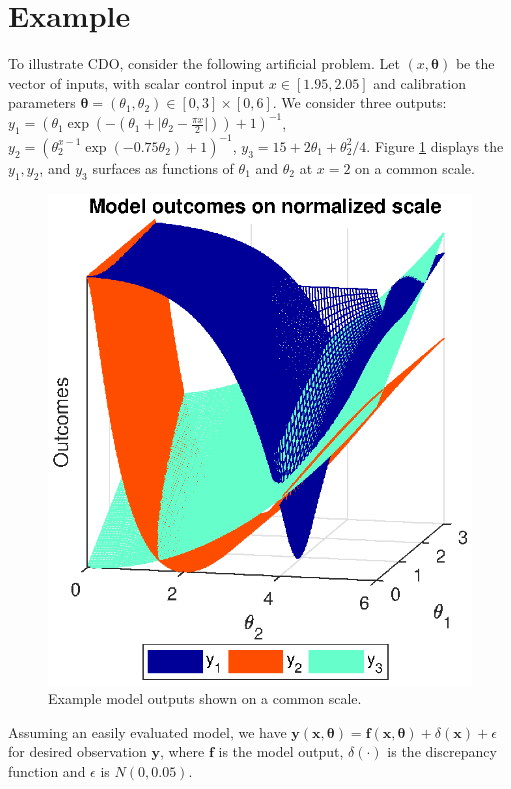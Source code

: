 \documentclass[12pt]{article}
\begin{document}
\section{Example}\label{example}
To illustrate CDO, consider the following artificial problem. 
%
Let $(x,\boldsymbol \theta)$ be the vector of inputs, with scalar control input $x\in[1.95,2.05]$ and calibration parameters $\boldsymbol \theta = (\theta_1,\theta_2)\in[0,3]\times[0,6]$.
%
We consider three outputs:
%
$
y_1 = \left(\theta_1 \exp\left(-\left(\theta_1 + \lvert \theta_2-\frac{\pi x}2\rvert \right)\right)+1\right)^{-1}$, 
$
y_2 = \left(\theta_2^{x-1} \exp\left(-0.75 \theta_2\right) + 1 \right)^{-1}
$, 
$
y_3 = 15 + 2 \theta_1 + {\theta_2^2}/4.
$
%
Figure \ref{fig:toy_sim_outputs} displays the $y_1, y_2$, and $y_3$ surfaces as functions of $\theta_1$ and $\theta_2$ at $x = 2$ on a common scale.
%
\begin{figure}
\centering
\includegraphics[width=.4\linewidth]{FIG_toy_sim_model_outputs.eps}
\caption{Example model outputs shown on a common scale.}
\label{fig:toy_sim_outputs}
\end{figure}
%
Assuming an easily evaluated model, we have
%
$
\mathbf y(\mathbf x, \boldsymbol\theta) = \mathbf f(\mathbf x,\boldsymbol \theta) + \delta(\mathbf x) + \epsilon
$
%
for desired observation $\mathbf y$, where $\mathbf f$ is the model output, $\delta(\cdot)$ is the discrepancy function and $\epsilon$ is $N(0,0.05)$.
\end{document}
